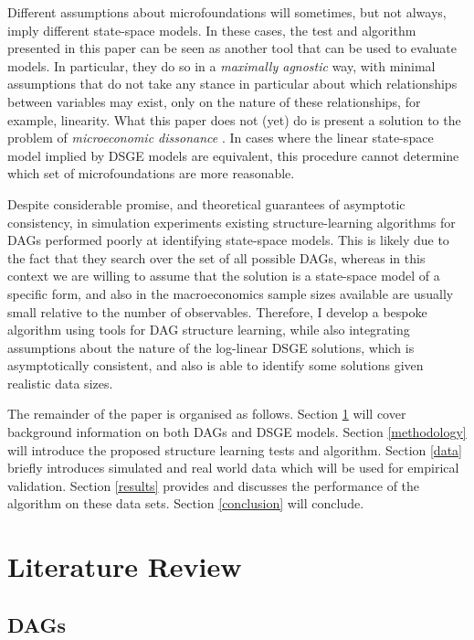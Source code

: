 \documentclass{article}
\begin{document}
Different assumptions about microfoundations will sometimes, but not always, imply different state-space models. In these cases, the test and algorithm presented in this paper can be seen as another tool that can be used to evaluate models. In particular, they do so in a \textit{maximally agnostic} way, with minimal assumptions that do not take any stance in particular about which relationships between variables may exist, only on the nature of these relationships, for example, linearity. What this paper does not (yet) do is present a solution to the problem of \textit{microeconomic dissonance} \parencite{levin2008macroeconometric}. In cases where the linear state-space model implied by DSGE models are equivalent, this procedure cannot determine which set of microfoundations are more reasonable.

Despite considerable promise, and theoretical guarantees of asymptotic consistency, in simulation experiments existing structure-learning algorithms for DAGs performed poorly at identifying state-space models. This is likely due to the fact that they search over the set of all possible DAGs, whereas in this context we are willing to assume that the solution is a state-space model of a specific form, and also in the macroeconomics sample sizes available are usually small relative to the number of observables. Therefore, I develop a bespoke algorithm using tools for DAG structure learning, while also integrating assumptions about the nature of the log-linear DSGE solutions, which is asymptotically consistent, and also is able to identify some solutions given realistic data sizes.

The remainder of the paper is organised as follows. Section \ref{lit_review} will cover background information on both DAGs and DSGE models. Section \ref{methodology} will introduce the proposed structure learning tests and algorithm. Section \ref{data} briefly introduces simulated and real world data which will be used for empirical validation. Section \ref{results} provides and discusses the performance of the algorithm on these data sets. Section \ref{conclusion} will conclude.  

\section{Literature Review} \label{lit_review}

\subsection{DAGs} \label{dags}
\end{document}
